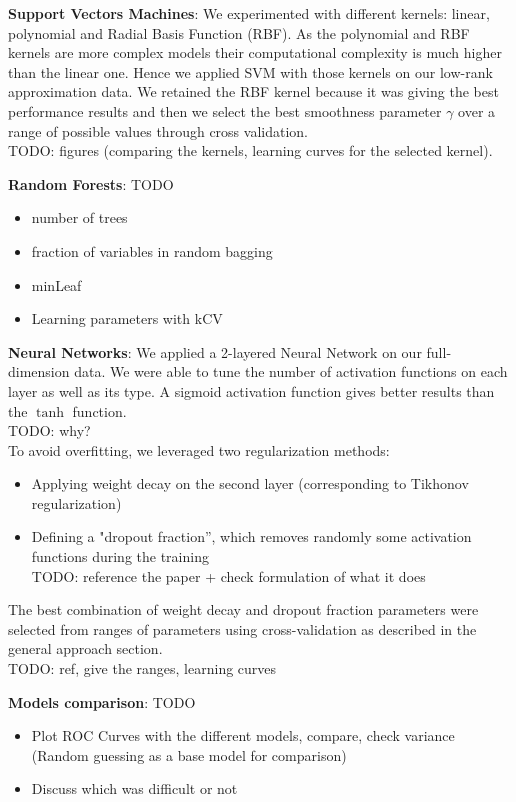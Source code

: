\documentclass{article}
\begin{document}
  \textbf{Support Vectors Machines}: We experimented with different kernels: linear, polynomial and Radial Basis Function (RBF). As the polynomial and RBF kernels are more complex models their computational complexity is much higher than the linear one. Hence we applied SVM with those kernels on our low-rank approximation data. We retained the RBF kernel because it was giving the best performance results and then we select the best smoothness parameter $\gamma$ over a range of possible values through cross validation.\\
  TODO: figures (comparing the kernels, learning curves for the selected kernel).

  \textbf{Random Forests}: TODO
  \begin{itemize}
    \item number of trees
    \item fraction of variables in random bagging
    \item minLeaf
    \item Learning parameters with kCV
  \end{itemize}

  \textbf{Neural Networks}: We applied a 2-layered Neural Network on our full-dimension data. We were able to tune the number of activation functions on each layer as well as its type. A sigmoid activation function gives better results than the $\tanh$ function.\\
  TODO: why?\\
  To avoid overfitting, we leveraged two regularization methods:
  \begin{itemize}
   	\item Applying weight decay on the second layer (corresponding to Tikhonov regularization)
	  \item Defining a "dropout fraction'', which removes randomly some activation functions during the training\\
    TODO: reference the paper + check formulation of what it does
  \end{itemize}
	The best combination of weight decay and dropout fraction parameters were selected from ranges of parameters using cross-validation as described in the general approach section.\\
  TODO: ref, give the ranges, learning curves

  \textbf{Models comparison}: TODO\\
  \begin{itemize}
    \item Plot ROC Curves with the different models, compare, check variance (Random guessing as a base model for comparison)\\
    \item Discuss which was difficult or not
  \end{itemize}
\end{document}
